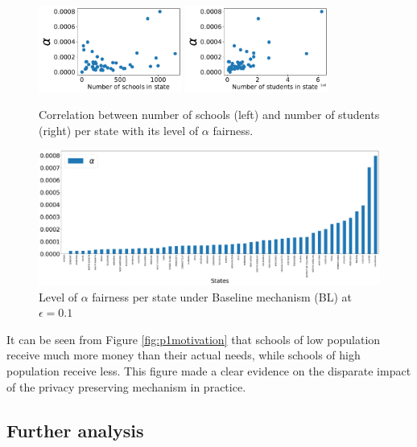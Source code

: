 \documentclass[9pt,twocolumn,twoside,lineno]{pnas-new}
\begin{document}
\begin{figure}[!ht]
    \centering
    \includegraphics[width=0.48\linewidth, height=80pt]{images/corr_num_school_alpha.pdf}
    \includegraphics[width=0.48\linewidth, height=80pt]{images/corr_num_students_alpha.pdf}
    \caption{Correlation between number of schools (left) and number of students (right) per state with its level of $\alpha$ fairness. }
    \label{fig:corr_fair_num_schools}
    \label{fig:corr_fair_num_students}
\end{figure}


\begin{figure}[h]
\centering
\includegraphics[width=1.0\linewidth]{images/states_alpha.pdf}
\caption{Level of  $\alpha$ fairness per state  under Baseline mechanism (BL) at $\epsilon = 0.1$}
\label{fig:state_alpha}
\end{figure}


It can be seen from Figure \ref{fig:p1motivation} that schools of low population receive much more money than their actual needs, while schools of high population receive less. This figure made a clear evidence on the disparate impact of the privacy preserving mechanism in practice. 


\subsection*{Further analysis}
\end{document}
